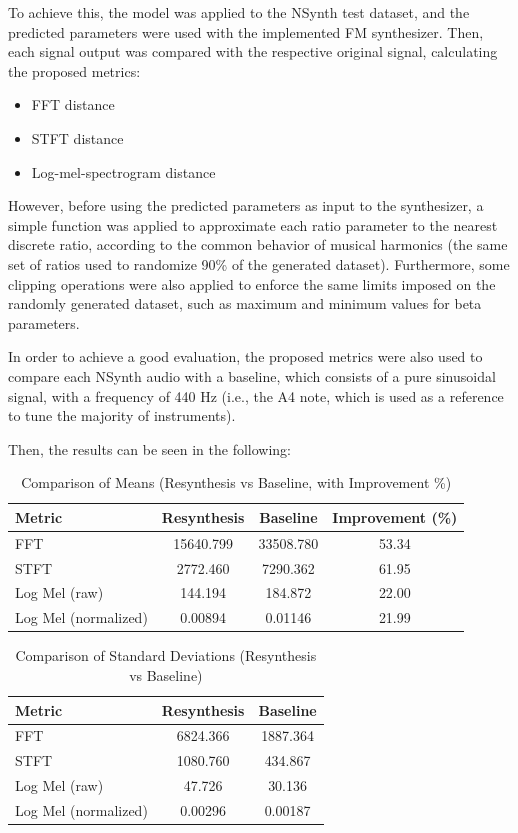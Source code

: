\documentclass[sigconf,natbib=false]{acmart}
\begin{document}
To achieve this, the model was applied to the NSynth test dataset, and the predicted parameters were used with the implemented FM synthesizer. Then, each signal output was compared with the respective original signal, calculating the proposed metrics:

\begin{itemize}
  \item FFT distance
  \item STFT distance
  \item Log-mel-spectrogram distance
\end{itemize}

However, before using the predicted parameters as input to the synthesizer, a simple function was applied to approximate each ratio parameter to the nearest discrete ratio, according to the common behavior of musical harmonics (the same set of ratios used to randomize 90\% of the generated dataset). Furthermore, some clipping operations were also applied to enforce the same limits imposed on the randomly generated dataset, such as maximum and minimum values for beta parameters.

In order to achieve a good evaluation, the proposed metrics were also used to compare each NSynth audio with a baseline, which consists of a pure sinusoidal signal, with a frequency of 440 Hz (i.e., the A4 note, which is used as a reference to tune the majority of instruments).

Then, the results can be seen in the following:

\begin{table}
  \caption{Comparison of Means (Resynthesis vs Baseline, with Improvement \%)}
  \label{tab:metrics_means}
  \begin{tabular}{lccc}
    \toprule
    Metric & Resynthesis & Baseline & Improvement (\%) \\
    \midrule
    FFT   & 15640.799 & 33508.780 & 53.34 \\
    STFT  & 2772.460  & 7290.362  & 61.95 \\
    Log Mel (raw) & 144.194 & 184.872 & 22.00 \\
    Log Mel (normalized) & 0.00894 & 0.01146 & 21.99 \\
    \bottomrule
  \end{tabular}
\end{table}

\begin{table}
  \caption{Comparison of Standard Deviations (Resynthesis vs Baseline)}
  \label{tab:metrics_std}
  \begin{tabular}{lcc}
    \toprule
    Metric & Resynthesis & Baseline \\
    \midrule
    FFT   & 6824.366 & 1887.364 \\
    STFT  & 1080.760 & 434.867  \\
    Log Mel (raw) & 47.726 & 30.136 \\
    Log Mel (normalized) & 0.00296 & 0.00187 \\
    \bottomrule
  \end{tabular}
\end{table}
\end{document}
